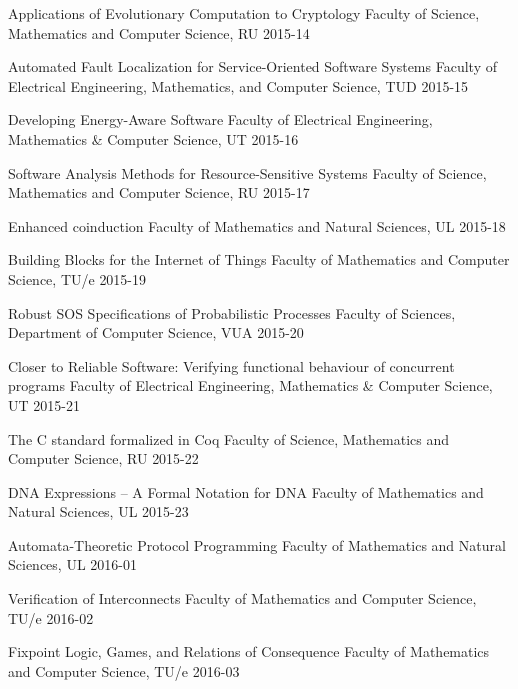 \begin{multicols}{2}
         {Applications of Evolutionary Computation to Cryptology}
         {Faculty of Science, Mathematics and Computer Science, RU}
         {2015-14}

         {Automated Fault Localization for Service-Oriented Software Systems}
         {Faculty of Electrical Engineering, Mathematics, and Computer Science, TUD}
         {2015-15}

         {Developing Energy-Aware Software}
         {Faculty of Electrical Engineering, Mathematics \& Computer Science, UT}
         {2015-16}

         {Software Analysis Methods for Resource-Sensitive Systems}
         {Faculty of Science, Mathematics and Computer Science, RU}
         {2015-17}

         {Enhanced coinduction}
         {Faculty of Mathematics and Natural Sciences, UL}
         {2015-18}

         {Building Blocks for the Internet of Things}
         {Faculty of Mathematics and Computer Science, TU/e}
         {2015-19}

         {Robust SOS Specifications of Probabilistic Processes}
         {Faculty of Sciences, Department of Computer Science, VUA}
         {2015-20}

         {Closer to Reliable Software: Verifying functional behaviour of concurrent programs}
         {Faculty of Electrical Engineering, Mathematics \& Computer Science, UT}
         {2015-21}

         {The C standard formalized in Coq}
         {Faculty of Science, Mathematics and Computer Science, RU}
         {2015-22}

         {DNA Expressions -- A Formal Notation for DNA}
         {Faculty of Mathematics and Natural Sciences, UL}
         {2015-23}

         {Automata-Theoretic Protocol Programming}
         {Faculty of Mathematics and Natural Sciences, UL}
         {2016-01}

         {Verification of Interconnects}
         {Faculty of Mathematics and Computer Science, TU/e}
         {2016-02}

         {Fixpoint Logic, Games, and Relations of Consequence}
         {Faculty of Mathematics and Computer Science, TU/e}
         {2016-03}


\end{multicols}
